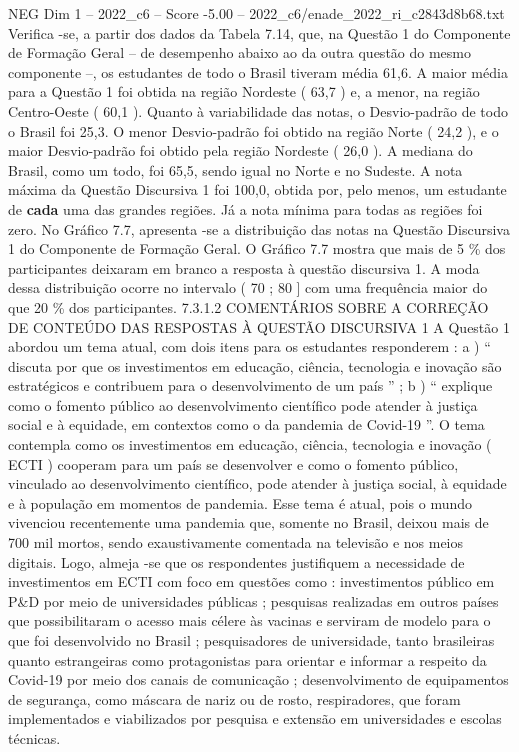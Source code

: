 \begin{textsample}{NEG Dim 1 – 2022\_c6 – Score -5.00 – 2022\_c6/enade\_2022\_ri\_c2843d8b68.txt}
Verifica -se, a partir dos dados da Tabela 7.14, que, na Questão 1 do Componente de Formação Geral – de desempenho abaixo ao da outra questão do mesmo componente –, os estudantes de todo o Brasil tiveram média 61,6.
A maior média para a Questão 1 foi obtida na região Nordeste ( 63,7 ) e, a menor, na região Centro-Oeste ( 60,1 ).
Quanto à variabilidade das notas, o Desvio-padrão de todo o Brasil foi 25,3.
O menor Desvio-padrão foi obtido na região Norte ( 24,2 ), e o maior Desvio-padrão foi obtido pela região Nordeste ( 26,0 ).
A mediana do Brasil, como um todo, foi 65,5, sendo igual no Norte e no Sudeste.
A nota máxima da Questão Discursiva 1 foi 100,0, obtida por, pelo menos, um estudante de \textbf{cada} uma das grandes regiões.
Já a nota mínima para todas as regiões foi zero.
No Gráfico 7.7, apresenta -se a distribuição das notas na Questão Discursiva 1 do Componente de Formação Geral.
O Gráfico 7.7 mostra que mais de 5 \% dos participantes deixaram em branco a resposta à questão discursiva 1.
A moda dessa distribuição ocorre no intervalo ( 70 ; 80 ] com uma frequência maior do que 20 \% dos participantes. 7.3.1.2 COMENTÁRIOS SOBRE A CORREÇÃO DE CONTEÚDO DAS RESPOSTAS À QUESTÃO DISCURSIVA 1 A Questão 1 abordou um tema atual, com dois itens para os estudantes responderem : a ) “ discuta por que os investimentos em educação, ciência, tecnologia e inovação são estratégicos e contribuem para o desenvolvimento de um país ” ; b ) “ explique como o fomento público ao desenvolvimento científico pode atender à justiça social e à equidade, em contextos como o da pandemia de Covid-19 ”.
O tema contempla como os investimentos em educação, ciência, tecnologia e inovação ( ECTI ) cooperam para um país se desenvolver e como o fomento público, vinculado ao desenvolvimento científico, pode atender à justiça social, à equidade e à população em momentos de pandemia.
Esse tema é atual, pois o mundo vivenciou recentemente uma pandemia que, somente no Brasil, deixou mais de 700 mil mortos, sendo exaustivamente comentada na televisão e nos meios digitais.
Logo, almeja -se que os respondentes justifiquem a necessidade de investimentos em ECTI com foco em questões como : investimentos público em P\&D por meio de universidades públicas ; pesquisas realizadas em outros países que possibilitaram o acesso mais célere às vacinas e serviram de modelo para o que foi desenvolvido no Brasil ; pesquisadores de universidade, tanto brasileiras quanto estrangeiras como protagonistas para orientar e informar a respeito da Covid-19 por meio dos canais de comunicação ; desenvolvimento de equipamentos de segurança, como máscara de nariz ou de rosto, respiradores, que foram implementados e viabilizados por pesquisa e extensão em universidades e escolas técnicas.

\end{textsample}
